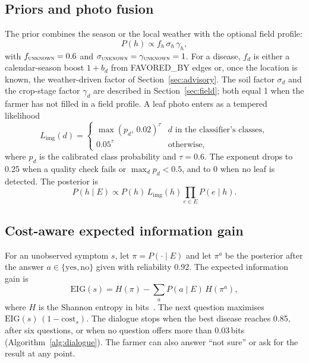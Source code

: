 \documentclass[conference]{IEEEtran}
\newcommand{\unk}{\textsc{unknown}}
\newcommand{\EIG}{\mathrm{EIG}}
\begin{document}
\subsection{Priors and photo fusion}
The prior combines the season or the local weather with the optional field profile:
\begin{equation}
  P(h) \propto f_h\, \sigma_h\, \gamma_h ,
  \label{eq:prior}
\end{equation}
with $f_\unk=0.6$ and $\sigma_\unk=\gamma_\unk=1$. For a disease, $f_d$ is either a calendar-season boost $1 + b_d$ from \textsf{FAVORED\_BY} edges or, once the location is known, the weather-driven factor of Section~\ref{sec:advisory}. The soil factor $\sigma_d$ and the crop-stage factor $\gamma_d$ are described in Section~\ref{sec:field}; both equal 1 when the farmer has not filled in a field profile. A leaf photo enters as a tempered likelihood
\begin{equation}
  L_{\mathrm{img}}(d) = \begin{cases} \max(p_d,\,0.02)^{\tau} & d \text{ in the classifier's classes},\\ 0.05^{\tau} & \text{otherwise,} \end{cases}
  \label{eq:photo}
\end{equation}
where $p_d$ is the calibrated class probability and $\tau=0.6$. The exponent drops to 0.25 when a quality check fails or $\max_d p_d<0.5$, and to 0 when no leaf is detected. The posterior is
\begin{equation}
  P(h\mid E) \propto P(h)\, L_{\mathrm{img}}(h) \prod_{e\in E} P(e\mid h).
  \label{eq:post}
\end{equation}

\subsection{Cost-aware expected information gain}
For an unobserved symptom $s$, let $\pi=P(\cdot\mid E)$ and let $\pi^{a}$ be the posterior after the answer $a\in\{\text{yes},\text{no}\}$ given with reliability 0.92. The expected information gain is
\begin{equation}
  \EIG(s) = H(\pi) - \sum_{a} P(a\mid E)\, H(\pi^{a}),
  \label{eq:eig}
\end{equation}
where $H$ is the Shannon entropy in bits~\cite{lindley1956}. The next question maximises $\EIG(s)\,(1-\mathrm{cost}_s)$. The dialogue stops when the best disease reaches 0.85, after six questions, or when no question offers more than 0.03\,bits (Algorithm~\ref{alg:dialogue}). The farmer can also answer ``not sure'' or ask for the result at any point.
\end{document}
